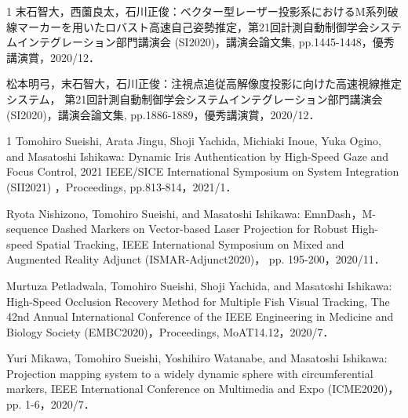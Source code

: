 \begin{受賞}{1}
末石智大，西薗良太，石川正俊：ベクター型レーザー投影系におけるM系列破線マーカーを用いたロバスト高速自己姿勢推定，第21回計測自動制御学会システムインテグレーション部門講演会 (SI2020)，講演会論文集, pp.1445-1448，優秀講演賞，2020/12．

松本明弓，末石智大，石川正俊：注視点追従高解像度投影に向けた高速視線推定システム， 第21回計測自動制御学会システムインテグレーション部門講演会 (SI2020)，講演会論文集, pp.1886-1889，優秀講演賞，2020/12．

\end{受賞}

\begin{査読付}{1}
Tomohiro Sueishi, Arata Jingu, Shoji Yachida, Michiaki Inoue, Yuka Ogino, and Masatoshi Ishikawa: Dynamic Iris Authentication by High-Speed Gaze and Focus Control, 2021 IEEE/SICE International Symposium on System Integration (SII2021) ，Proceedings, pp.813-814，2021/1．

Ryota Nishizono, Tomohiro Sueishi, and Masatoshi Ishikawa: EmnDash，M-sequence Dashed Markers on Vector-based Laser Projection for Robust High-speed Spatial Tracking, IEEE International Symposium on Mixed and Augmented Reality Adjunct (ISMAR-Adjunct2020)， pp. 195-200，2020/11．

Murtuza Petladwala, Tomohiro Sueishi, Shoji Yachida, and Masatoshi Ishikawa: High-Speed Occlusion Recovery Method for Multiple Fish Visual Tracking, The 42nd Annual International Conference of the IEEE Engineering in Medicine and Biology Society (EMBC2020)，Proceedings, MoAT14.12，2020/7．

Yuri Mikawa, Tomohiro Sueishi, Yoshihiro Watanabe, and Masatoshi Ishikawa: Projection mapping system to a widely dynamic sphere with circumferential markers, IEEE International Conference on Multimedia and Expo (ICME2020)， pp. 1-6，2020/7．

\end{査読付}

